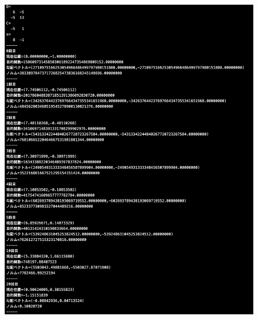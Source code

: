 \documentclass[12pt]{jarticle}
\begin{document}
\clearpage
\begin{figure}[h]
    \begin{center}
        \includegraphics[scale=0.2]{kadai1_1s_out1_3_1.png}
    \end{center}
    \begin{minipage}{0.5\hsize}
        \begin{center}

\end{center}
\end{minipage}
\end{figure}
\end{document}
